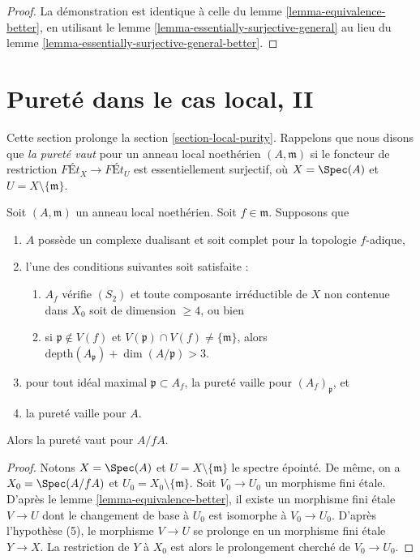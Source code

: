 \begin{proof}
La démonstration est identique à celle du
lemme \ref{lemma-equivalence-better},
en utilisant le
lemme \ref{lemma-essentially-surjective-general}
au lieu du
lemme \ref{lemma-essentially-surjective-general-better}.
\end{proof}



\section{Pureté dans le cas local, II}
\label{section-local-purity-II}

\noindent
Cette section prolonge la section \ref{section-local-purity}.
Rappelons que nous disons que {\it la pureté vaut} pour un anneau local noethérien
$(A, \mathfrak m)$ si le foncteur de restriction
$\textit{F\'Et}_X \to \textit{F\'Et}_U$ est essentiellement
surjectif, où $X = \Spec(A)$ et $U = X \setminus \{\mathfrak m\}$.

\begin{lemma}
\label{lemma-purity-inherited-by-hypersurface-better}
Soit $(A, \mathfrak m)$ un anneau local noethérien.
Soit $f \in \mathfrak m$. Supposons que
\begin{enumerate}
\item $A$ possède un complexe dualisant et soit complet pour la topologie $f$-adique,
\item l'une des conditions suivantes soit satisfaite :
\begin{enumerate}
\item $A_f$ vérifie $(S_2)$ et toute composante irréductible de $X$
non contenue dans $X_0$ soit de dimension $\geq 4$, ou bien
\item si $\mathfrak p \not \in V(f)$ et
$V(\mathfrak p) \cap V(f) \not = \{\mathfrak m\}$, alors
$\text{depth}(A_\mathfrak p) + \dim(A/\mathfrak p) > 3$.
\end{enumerate}
\item pour tout idéal maximal $\mathfrak p \subset A_f$,
la pureté vaille pour $(A_f)_\mathfrak p$, et
\item la pureté vaille pour $A$.
\end{enumerate}
Alors la pureté vaut pour $A/fA$.
\end{lemma}

\begin{proof}
Notons $X = \Spec(A)$ et $U = X \setminus \{\mathfrak m\}$
le spectre épointé. De même, on a $X_0 = \Spec(A/fA)$
et $U_0 = X_0 \setminus \{\mathfrak m\}$.
Soit $V_0 \to U_0$ un morphisme fini étale. D'après le
lemme \ref{lemma-equivalence-better},
il existe un morphisme fini étale $V \to U$
dont le changement de base à $U_0$
est isomorphe à $V_0 \to U_0$.
D'après l'hypothèse (5), le morphisme $V \to U$ se prolonge
en un morphisme fini étale $Y \to X$. La restriction de
$Y$ à $X_0$ est alors le prolongement cherché de $V_0 \to U_0$.
\end{proof}

